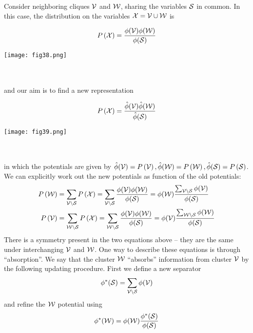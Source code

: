 Consider neighboring cliques $\mathcal{V}$ and $\mathcal{W}$, sharing the variables $\mathcal{S}$ in common. In this case, the distribution on the variables $\mathcal{X}=\mathcal{V}\cup\mathcal{W}$ is

\begin{minipage}{0.6\textwidth}
	\begin{align*}
	P\left(\mathcal{X}\right)=\frac{\phi(\mathcal{V})\phi(\mathcal{W})}{\phi(\mathcal{S})}
	\end{align*}
\end{minipage}
\begin{minipage}{0.4\textwidth}
	\centering
	\texttt{[image: fig38.png]}
\end{minipage}
\\ \\
and our aim is to find a new representation

\begin{minipage}{0.6\textwidth}
	\begin{align*}
	P\left(\mathcal{X}\right)=\frac{\hat{\phi}(\mathcal{V})\hat{\phi}(\mathcal{W})}{\hat{\phi}(\mathcal{S})}
	\end{align*}
\end{minipage}
\begin{minipage}{0.4\textwidth}
	\centering
	\texttt{[image: fig39.png]}
\end{minipage}
\\ \\
in which the potentials are given by $\hat{\phi}(\mathcal{V})=P\left(\mathcal{V}\right),\hat{\phi}(\mathcal{W})=P\left(\mathcal{W}\right),\hat{\phi}(\mathcal{S})=P\left(\mathcal{S}\right)$. We can explicitly work out the new potentials as function of the old potentials:
\begin{align*}
P\left(\mathcal{W}\right)&=\sum_{\mathcal{V}\setminus\mathcal{S}}P\left(\mathcal{X}\right)=\sum_{\mathcal{V}\setminus\mathcal{S}}\frac{\phi(\mathcal{V})\phi(\mathcal{W})}{\phi(\mathcal{S})}=\phi(\mathcal{W})\frac{\sum_{\mathcal{V}\setminus\mathcal{S}}\phi(\mathcal{V})}{\phi(\mathcal{S})} \\
P\left(\mathcal{V}\right)&=\sum_{\mathcal{W}\setminus\mathcal{S}}P\left(\mathcal{X}\right)=\sum_{\mathcal{W}\setminus\mathcal{S}}\frac{\phi(\mathcal{V})\phi(\mathcal{W})}{\phi(\mathcal{S})}=\phi(\mathcal{V})\frac{\sum_{\mathcal{W}\setminus\mathcal{S}}\phi(\mathcal{W})}{\phi(\mathcal{S})}
\end{align*}
There is a symmetry present in the two equations above -- they are the same under interchanging $\mathcal{V}$ and $\mathcal{W}$. One way to describe these equations is through ``absorption''.  We say that the cluster $\mathcal{W}$ ``absorbs'' information from cluster $\mathcal{V}$ by the following updating procedure. First we define a new separator
\begin{align*}
\phi^*(\mathcal{S})=\sum_{\mathcal{V}\setminus\mathcal{S}}\phi(\mathcal{V})
\end{align*}
and refine the $\mathcal{W}$ potential using
\begin{align*}
\phi^*(\mathcal{W})=\phi(\mathcal{W})\frac{\phi^*(\mathcal{S})}{\phi(\mathcal{S})}
\end{align*}
